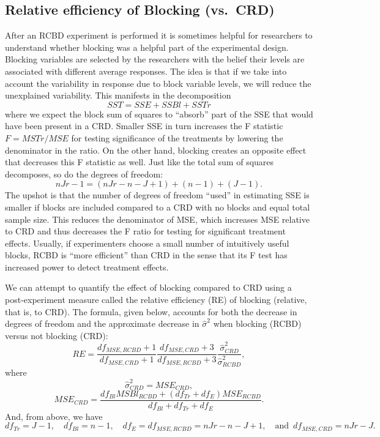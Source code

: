 \documentclass[
]{book}
\begin{document}
\hypertarget{relative-efficiency-of-blocking-vs.-crd}{%
\subsection{Relative efficiency of Blocking (vs.~CRD)}\label{relative-efficiency-of-blocking-vs.-crd}}

After an RCBD experiment is performed it is sometimes helpful for researchers to understand whether blocking was a helpful part of the experimental design. Blocking variables are selected by the researchers with the belief their levels are associated with different average responses. The idea is that if we take into account the variability in response due to block variable levels, we will reduce the unexplained variability. This manifests in the decomposition
\[SST = SSE + SSBl + SSTr\]
where we expect the block sum of squares to ``absorb'' part of the SSE that would have been present in a CRD. Smaller SSE in turn increases the F statistic \(F = MSTr/MSE\) for testing significance of the treatments by lowering the denominator in the ratio. On the other hand, blocking creates an opposite effect that decreases this F statistic as well. Just like the total sum of squares decomposes, so do the degrees of freedom:
\[nJr - 1 = (nJr - n - J + 1) + (n-1) + (J-1).\]
The upshot is that the number of degrees of freedom ``used'' in estimating SSE is smaller if blocks are included compared to a CRD with no blocks and equal total sample size. This reduces the denominator of MSE, which increases MSE relative to CRD and thus decreases the F ratio for testing for significant treatment effects. Usually, if experimenters choose a small number of intuitively useful blocks, RCBD is ``more efficient'' than CRD in the sense that its F test has increased power to detect treatment effects.

We can attempt to quantify the effect of blocking compared to CRD using a post-experiment measure called the relative efficiency (RE) of blocking (relative, that is, to CRD). The formula, given below, accounts for both the decrease in degrees of freedom and the approximate decrease in \(\hat\sigma^2\) when blocking (RCBD) versus not blocking (CRD):
\[RE = \frac{df_{MSE,RCBD} + 1}{df_{MSE,CRD} + 1}\frac{df_{MSE,CRD} + 3}{df_{MSE,RCBD} + 3}\frac{\hat\sigma^2_{CRD}}{\hat\sigma^2_{RCBD}},\]
where
\[\hat\sigma^2_{CRD} = MSE_{CRD},\]
\[MSE_{CRD} = \frac{df_{Bl}MSBl_{RCBD} + (df_{Tr}+df_{E})MSE_{RCBD}}{df_{Bl} + df_{Tr} + df_E}.\]
And, from above, we have
\[df_{Tr} = J-1, \quad df_{Bl} = n-1, \quad df_{E} = df_{MSE,RCBD} = nJr - n - J +1, \quad \text{and    }\, df_{MSE,CRD} = nJr - J.\]
\end{document}
